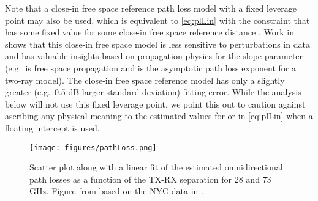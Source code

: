 \documentclass[journal]{IEEEtran}
\begin{document}
Note that a close-in free space reference path loss model with a fixed leverage
point may also be used, which is  equivalent to \eqref{eq:plLin}
with the constraint that  has some fixed value 
for some close-in free space reference distance .
Work in \cite{Rappaport-72GHz:13} shows that this close-in free space model
is less sensitive to perturbations in data and has valuable insights based on
propagation physics for the slope parameter  (e.g.\  is free space
propagation and  is the asymptotic path loss exponent for a
two-ray model).  The close-in free space reference model has only a slightly greater
(e.g.\ 0.5 dB larger standard deviation) fitting error.  While
the analysis below will not use this
fixed leverage point, we point this out to caution against
ascribing any physical meaning to the estimated values for  or
 in \eqref{eq:plLin} when a floating intercept is used.

\begin{figure}
    \centering
    \texttt{[image: figures/pathLoss.png]}
    \caption{Scatter plot along with a linear fit of the estimated omnidirectional
     path losses as a function of the TX-RX separation for 28 and 73 GHz.
     Figure from \cite{AkLiuRanRapEr:13-arxiv} based on the NYC data in
     \cite{rappaportmillimeter}.}
    \label{fig:distPL}
\end{figure}
\end{document}
